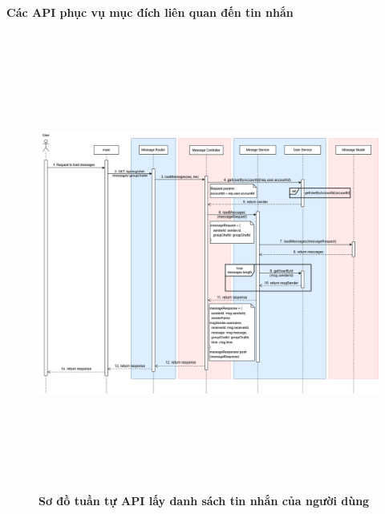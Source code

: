 \paragraph{Các API phục vụ mục đích liên quan đến tin nhắn}
\mbox{}
\begin{figure}[H]
	\centering
	\includegraphics[width=15cm,height=15cm]{Images/api_sequence/chat/loadMessages.drawio.png}
	\caption[Sơ đồ tuần tự API lấy danh sách tin nhắn của người dùng]{\bfseries \fontsize{12pt}{0pt}\selectfont Sơ đồ tuần tự API lấy danh sách tin nhắn của người dùng}
	\label{sequence_diagram_load_chat}
\end{figure}

